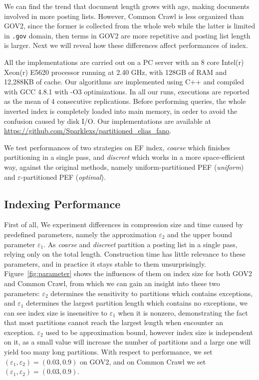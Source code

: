 \documentclass[runningheads,a4paper]{llncs}
\begin{document}
We can find the trend that document length grows with age, making documents involved in more posting lists.
However, Common Crawl is less organized than GOV2, since the former is collected from the whole web while the latter is limited in \texttt{.gov} domain, then terms in GOV2 are more repetitive and posting list length is larger.
Next we will reveal how these differences affect performances of index.

All the implementations are carried out on a PC server with an 8 core Intel(r) Xeon(r) E5620 processor running at 2.40 GHz, with 128GB of RAM and 12,288KB of cache. Our algorithms are implemented using C++ and compiled with GCC 4.8.1 with -O3 optimizations. In all our runs, executions are reported as the mean of 4 consecutive replications.
Before performing queries, the whole inverted index is completely loaded into main memory, in order to avoid the confusion caused by disk I/O.
Our implementations are available at \url{https://github.com/Sparklexs/partitioned_elias_fano}.

We test performances of two strategies on EF index, \textit{coarse} which finishes partitioning in a single pass, and \textit{discreet} which works in a more space-efficient way, against the original methods, namely uniform-partitioned PEF (\textit{uniform}) and $\varepsilon$-partitioned PEF (\textit{optimal}).

\subsection{Indexing Performance}

First of all, We experiment differences in compression size and time caused by predefined parameters, namely the approximation $\varepsilon_{2}$ and the upper bound parameter $\varepsilon_{1}$. As \textit{coarse} and \textit{discreet} partition a posting list in a single pass, relying only on the total length. Construction time has little relevance to these parameters, and in practice it stays stable to them unsurprisingly. Figure~\ref{fig:parameter} shows the influences of them on index size for both GOV2 and Common Crawl, from which we can gain an insight into these two parameters: $\varepsilon_{2}$ determines the sensitivity to partitions which contains exceptions, and $\varepsilon_{1}$ determines the largest partition length which contains no exceptions, we can see index size is insensitive to $\varepsilon_{1}$ when it is nonzero, demonstrating the fact that most partitions cannot reach the largest length when encounter an exception. $\varepsilon_{2}$ used to be approximation bound, however index size is independent on it, as a small value will increase the number of partitions and a large one will yield too many long partitions.
With respect to performance, we set $ \left( \varepsilon_1,\varepsilon_2 \right) = \left( 0.03,0.9 \right) $ on GOV2, and on Common Crawl we set $ \left( \varepsilon_1,\varepsilon_2 \right) = \left( 0.03,0.9 \right) $.
\end{document}
